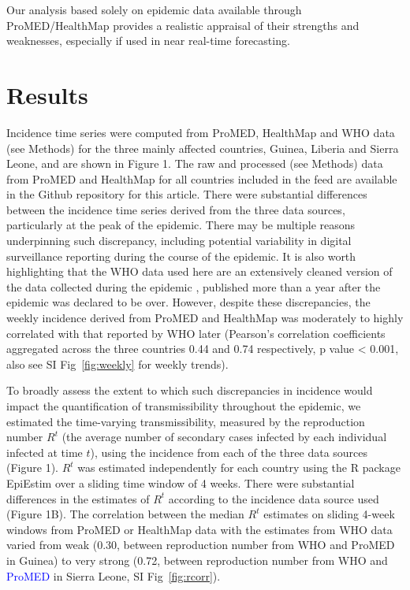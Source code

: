 \documentclass[9pt,twocolumn,twoside,lineno]{pnas-new}
\newcommand{\sangeeta}[1]{\textcolor{blue}{#1}}
\begin{document}
Our analysis based solely on epidemic data available through
ProMED/HealthMap provides a realistic appraisal of their strengths and
weaknesses, especially if used in near real-time forecasting.

\section*{Results}

Incidence time series were computed from ProMED, HealthMap and WHO data
(see Methods) for the three mainly affected countries, Guinea,
Liberia and Sierra Leone, and are shown in Figure 1. The raw and
processed (see Methods) data from ProMED and HealthMap for all countries
included in the feed are available in the Github repository for this
article. There were
substantial differences between the incidence time series derived from
the three data sources, particularly at the peak of the epidemic. There
may be multiple reasons underpinning such discrepancy, including
potential variability in digital surveillance reporting during the
course of the epidemic. It is also worth highlighting that the WHO data
used here are an extensively cleaned version of the data collected
during the epidemic \cite{who2014ebola, team2015west}, published
more than a year after the epidemic was declared to be over. However,
despite these discrepancies, the weekly incidence derived from ProMED
and HealthMap was moderately to highly correlated with that reported by
WHO later (Pearson's correlation coefficients aggregated across the
three countries 0.44 and 0.74 respectively, p value \textless{} 0.001,
also see SI Fig~\ref{fig:weekly} for weekly trends).

To broadly assess the extent to which such discrepancies in incidence
would impact the quantification of transmissibility throughout the
epidemic, we estimated the time-varying transmissibility, measured by
the reproduction number \(R^t\) (the average number of secondary cases
infected by each individual infected at time \(t\)), using the incidence
from each of the three data sources (Figure 1). \(R^t\) was estimated
independently for each country using the R package EpiEstim
\cite{cori2013new} over a sliding time window of 4 weeks. There were
substantial differences in the estimates of \(R^t\) according to the
incidence data source used (Figure 1B). The correlation between the
median $R^t$ estimates on sliding 4-week windows from ProMED or HealthMap
data with the estimates from WHO data varied from weak (0.30, between
reproduction number from WHO and ProMED in Guinea) to very strong
(0.72, between reproduction number from WHO and \sangeeta{ProMED} in Sierra
Leone, SI Fig~\ref{fig:rcorr}).
\end{document}
